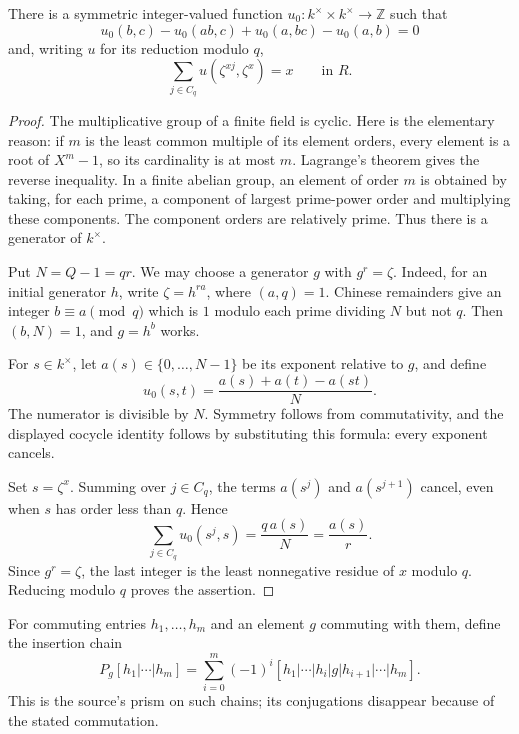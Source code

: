 \begin{lemma}\label{sf-carry}
There is a symmetric integer-valued function
\(u_0:k^\times\times k^\times\to\mathbb Z\) such that
\[
 u_0(b,c)-u_0(ab,c)+u_0(a,bc)-u_0(a,b)=0
\]
and, writing \(u\) for its reduction modulo \(q\),
\[
                \sum_{j\in C_q}u(\zeta^{xj},\zeta^x)=x
                         \qquad\text{in }R.
\]
\end{lemma}
\begin{proof}
The multiplicative group of a finite field is cyclic.
Here is the elementary reason: if \(m\) is the least
common multiple of its element orders, every element is
a root of \(X^m-1\), so its cardinality is at most \(m\).
Lagrange's theorem gives the reverse inequality.
In a finite abelian group, an element of order \(m\)
is obtained by taking, for each prime, a component of
largest prime-power order and multiplying these components.
The component orders are relatively prime.
Thus there is a generator of \(k^\times\).

Put \(N=Q-1=qr\).  We may choose a generator \(g\)
with \(g^r=\zeta\).
Indeed, for an initial generator \(h\), write
\(\zeta=h^{ra}\), where \((a,q)=1\).
Chinese remainders give an integer \(b\equiv a\pmod q\)
which is \(1\) modulo each prime dividing \(N\) but
not \(q\).  Then \((b,N)=1\), and \(g=h^b\) works.

For \(s\in k^\times\), let \(a(s)\in\{0,\ldots,N-1\}\)
be its exponent relative to \(g\), and define
\[
                  u_0(s,t)
                       =\frac{a(s)+a(t)-a(st)}{N}.
\]
The numerator is divisible by \(N\).
Symmetry follows from commutativity, and the displayed
cocycle identity follows by substituting this formula:
every exponent cancels.

Set \(s=\zeta^x\).  Summing over \(j\in C_q\),
the terms \(a(s^j)\) and \(a(s^{j+1})\) cancel,
even when \(s\) has order less than \(q\).  Hence
\[
       \sum_{j\in C_q}u_0(s^j,s)
             =\frac{q\,a(s)}{N}=\frac{a(s)}r.
\]
Since \(g^r=\zeta\), the last integer is the least
nonnegative residue of \(x\) modulo \(q\).
Reducing modulo \(q\) proves the assertion.
\end{proof}

For commuting entries \(h_1,\ldots,h_m\) and an element
\(g\) commuting with them, define the insertion chain
\[
 P_g[h_1|\cdots|h_m]
   =\sum_{i=0}^m(-1)^i
       [h_1|\cdots|h_i|g|h_{i+1}|\cdots|h_m].
\]
This is the source's prism on such chains; its conjugations
disappear because of the stated commutation.

